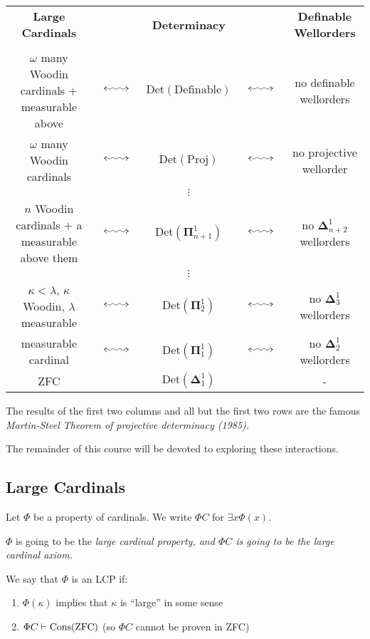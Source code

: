 \documentclass[]{article}
\makeatletter
\newcommand{\longsquiggly}{\xymatrix{{}\ar@{<~>}[r]&{}}}
\newcommand{\bopi}{\bm{\Pi}}
\newcommand{\bodel}{\bm{\Delta}}
\newcommand{\Det}{\textrm{Det}}
\makeatother
\begin{document}
\begin{center}
    \begin{tabular}{ccccc}\\
        \textbf{Large Cardinals} & &\textbf{Determinacy} & &\textbf{Definable Wellorders}\\ 
        &   &  & & \\
        $\omega$ many Woodin cardinals $+$ measurable above &$\longsquiggly$ & $\Det(\textrm{Definable})$  & $\longsquiggly$ & no definable wellorders\\
        $\omega$ many Woodin cardinals & $\longsquiggly$ & $\Det(\textrm{Proj})$ & $\longsquiggly$ & no projective wellorder\\
        &   & $\vdots$ & & \\
        $n$ Woodin cardinals $+$ a measurable above them & $\longsquiggly$ & $\Det(\bopi^1_{n+1})$ & $\longsquiggly$ & no $\bodel^1_{n+2}$ wellorders\\
            &   & $\vdots$ & & \\
         $\kappa < \lambda$, $\kappa$ Woodin, $\lambda$ measurable &$\longsquiggly$ & $\Det(\bopi^1_2)$ & $\longsquiggly$ & no $\bodel^1_3$ wellorders \\
        measurable cardinal & $\longsquiggly$ & $\Det(\bopi^1_1)$ & $\longsquiggly$ & no $\bodel^1_2$ wellorders \\
        ZFC && $\Det(\bodel^1_1)$ && -
    \end{tabular}
\end{center}

The results of the first two columns and all but the first two rows are the famous \it{Martin-Steel Theorem of projective determinacy} (1985).


The remainder of this course will be devoted to exploring these interactions.

\subsection*{Large Cardinals}
\begin{remark*}
    Let $\Phi$ be a property of cardinals. We write $\Phi C$ for $\exists x \Phi(x)$.

    $\Phi$ is going to be the \it{large cardinal property}, and $\Phi C$ is going to be the \it{large cardinal axiom}.

    We say that $\Phi$ is an LCP if:
    \begin{enumerate}[label = (\roman*)]
        \item $\Phi(\kappa)$ implies that $\kappa$ is ``large'' in some sense
        \item $\Phi C \vdash \textrm{Cons}(\textrm{ZFC})$ (so $\Phi C$ cannot be proven in ZFC)
    \end{enumerate}
\end{remark*}
\end{document}
